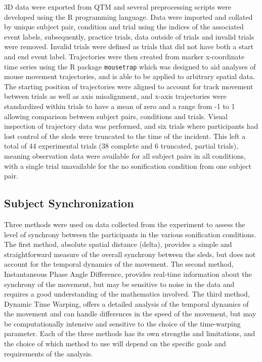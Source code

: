 \documentclass[10pt,a4paper,onecolumn]{article}
\begin{document}
3D data were exported from QTM and several preprocessing scripts were developed using the R programming language. Data were imported and collated by unique subject pair, condition and trial using the indices of the associated event labels, subsequently, practice trials, data outside of trials and invalid trials were removed. Invalid trials were defined as trials that did not have both a start and end event label. Trajectories were then created from marker x-coordinate time series using the R package \texttt{mousetrap} \autocite{mousetrap2021} which was designed to aid analyses of mouse movement trajectories, and is able to be applied to arbitrary spatial data. The starting position of trajectories were aligned to account for track movement between trials as well as axis misalignment, and x-axis trajectories were standardized within trials to have a mean of zero and a range from -1 to 1 allowing comparison between subject pairs, conditions and trials. Visual inspection of trajectory data was performed, and six trials where participants had lost control of the sleds were truncated to the time of the incident. This left a total of 44 experimental trials (38 complete and 6 truncated, partial trials), meaning observation data were available for all subject pairs in all conditions, with a single trial unavailable for the no sonification condition from one subject pair.

\hypertarget{subject-synchronization}{%
\subsection{Subject Synchronization}\label{subject-synchronization}}

Three methods were used on data collected from the experiment to assess the level of synchrony between the participants in the various sonification conditions. The first method, absolute spatial distance (delta), provides a simple and straightforward measure of the overall synchrony between the sleds, but does not account for the temporal dynamics of the movement. The second method, Instantaneous Phase Angle Difference, provides real-time information about the synchrony of the movement, but may be sensitive to noise in the data and requires a good understanding of the mathematics involved. The third method, Dynamic Time Warping, offers a detailed analysis of the temporal dynamics of the movement and can handle differences in the speed of the movement, but may be computationally intensive and sensitive to the choice of the time-warping parameter. Each of the three methods has its own strengths and limitations, and the choice of which method to use will depend on the specific goals and requirements of the analysis.
\end{document}
